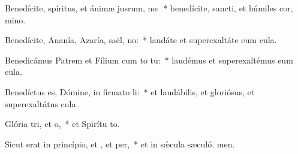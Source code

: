 \item Benedícite, spíritus, et ánimæ jusrum, no:~* benedícite, sancti, et húmiles cor, mino.
\item Benedícite, Ananía, Azaría, saël, no:~* laudáte et superexaltáte eum  cula.
\item Benedicámus Patrem et Fílium cum to tu:~* laudémus et superexaltémus eum  cula.
\item Benedíctus es, Dómine, in firmato li:~* et laudábilis, et gloriósus, et superexaltátus  cula.
\item Glória tri, et o,~* et Spirítu to.
\item Sicut erat in princípio, et , et per,~* et in sǽcula sæculó. men.
